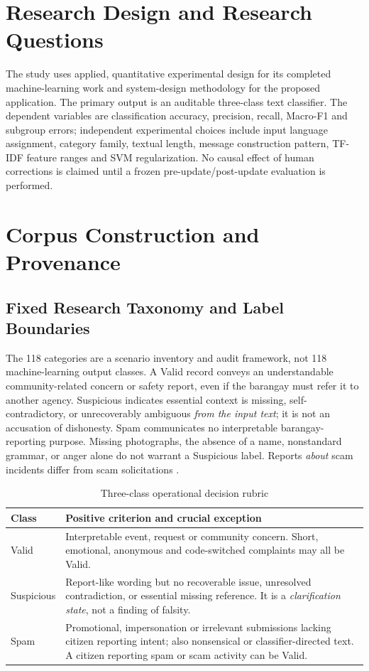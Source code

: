 

\section{Research Design and Research Questions}
The study uses applied, quantitative experimental design for its completed machine-learning work and system-design methodology for the proposed application. The primary output is an auditable three-class text classifier. The dependent variables are classification accuracy, precision, recall, Macro-F1 and subgroup errors; independent experimental choices include input language assignment, category family, textual length, message construction pattern, TF-IDF feature ranges and SVM regularization. No causal effect of human corrections is claimed until a frozen pre-update/post-update evaluation is performed.

\section{Corpus Construction and Provenance}
\subsection{Fixed Research Taxonomy and Label Boundaries}
The 118 categories are a scenario inventory and audit framework, not 118 machine-learning output classes. A Valid record conveys an understandable community-related concern or safety report, even if the barangay must refer it to another agency. Suspicious indicates essential context is missing, self-contradictory, or unrecoverably ambiguous \emph{from the input text}; it is not an accusation of dishonesty. Spam communicates no interpretable barangay-reporting purpose. Missing photographs, the absence of a name, nonstandard grammar, or anger alone do not warrant a Suspicious label. Reports \emph{about} scam incidents differ from scam solicitations \cite{ra7160,ra9262,ibanez}.
\begin{table}[H]\centering\caption{Three-class operational decision rubric}\small\begin{tabularx}{\textwidth}{p{}X}\toprule
\textbf{Class} & \textbf{Positive criterion and crucial exception}\\\midrule
Valid & Interpretable event, request or community concern. Short, emotional, anonymous and code-switched complaints may all be Valid.\\
Suspicious & Report-like wording but no recoverable issue, unresolved contradiction, or essential missing reference. It is a \emph{clarification state}, not a finding of falsity.\\
Spam & Promotional, impersonation or irrelevant submissions lacking citizen reporting intent; also nonsensical or classifier-directed text. A citizen reporting spam or scam activity can be Valid.\\\bottomrule
\end{tabularx}\end{table}

